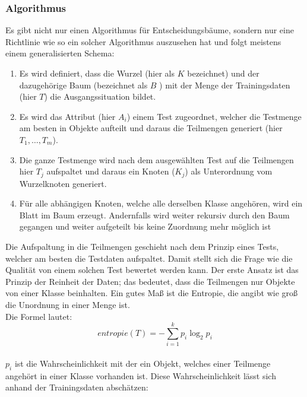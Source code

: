 \subsubsection{Algorithmus}

Es gibt nicht nur einen Algorithmus für Entscheidungsbäume, sondern nur eine Richtlinie wie so ein solcher Algorithmus auszusehen hat und folgt meistens einem generalisierten Schema:

\begin{enumerate}
	\item Es wird definiert, dass die Wurzel (hier als \(K\) bezeichnet) und der dazugehörige Baum (bezeichnet als \(B\) ) mit der Menge der Trainingsdaten (hier \(T\)) die Ausgangssituation bildet.\\
	\item Es wird das Attribut (hier 	\(A_i\)) einem Test zugeordnet, welcher die Testmenge am besten in Objekte aufteilt und daraus die Teilmengen generiert (hier \(T_1,\dotsc,T_m\)).\\	
	\item Die ganze Testmenge wird  nach dem ausgewählten Test auf die Teilmengen hier \(T_j\) aufspaltet und daraus ein Knoten (\(K_j\)) als Unterordnung vom Wurzelknoten generiert.\\	
	\item Für alle abhängigen Knoten, welche alle derselben Klasse angehören, wird ein Blatt im Baum erzeugt. Andernfalls wird weiter rekursiv durch den Baum gegangen und weiter aufgeteilt bis keine Zuordnung mehr möglich ist\\
	
\end{enumerate} 


Die Aufspaltung in die Teilmengen geschieht nach dem Prinzip eines Tests, welcher am besten die Testdaten aufspaltet.  Damit stellt sich die Frage wie die Qualität von einem solchen Test bewertet werden kann. Der erste Ansatz ist das Prinzip der Reinheit der Daten; das bedeutet, dass die Teilmengen nur Objekte von einer Klasse beinhalten. Ein gutes Maß ist die Entropie, die angibt wie groß die Unordnung in einer Menge ist.\cite{brei84,mitch97}\\
 Die Formel lautet:\\

\[entropie(T) = -\displaystyle\sum_{i=1}^k p_i \log_2 p_i\]\\


\(p_i\) ist die Wahrscheinlichkeit mit der ein Objekt, welches einer Teilmenge angehört in einer Klasse vorhanden ist. Diese Wahrscheinlichkeit lässt sich anhand der Trainingsdaten abschätzen:\\

